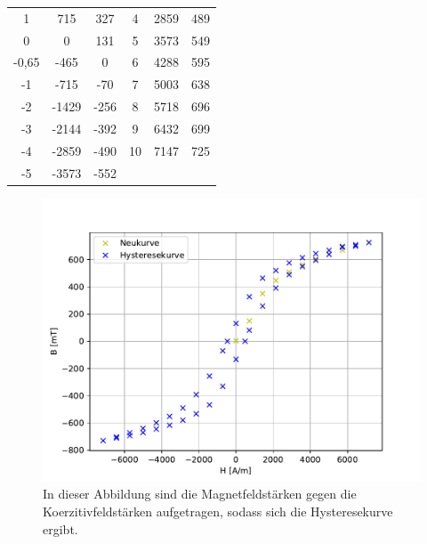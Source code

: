 \documentclass[titlepage = firstcover]{scrartcl}
\begin{document}
\begin{table}[h]
\begin{tabular}{c c c c c c}
                    1 &     715    & 327   & 4    &  2859&  489 \\
                    0 &     0      & 131   & 5    &  3573&  549 \\
                    -0,65 & -465   & 0 & 6        &  4288&  595 \\
                    -1 &    -715   & -70  & 7     &  5003&  638 \\
                    -2 &    -1429  & -256 & 8     &  5718&  696 \\
                    -3 &    -2144  & -392 & 9     &  6432&  699 \\
                    -4 &    -2859  & -490 & 10    &  7147&  725 \\
                    -5 &    -3573  & -552 & & & \\
                    \bottomrule
                \end{tabular}                
            \end{table}
    
            \begin{figure}[h]
                \centering
                \includegraphics{Hysterese.pdf}
                \caption{In dieser Abbildung sind die Magnetfeldstärken gegen die Koerzitivfeldstärken aufgetragen, sodass sich die Hysteresekurve ergibt.}
                \label{fig:Hysterese}
    
            \end{figure}
    
            \newpage
            
\end{document}

